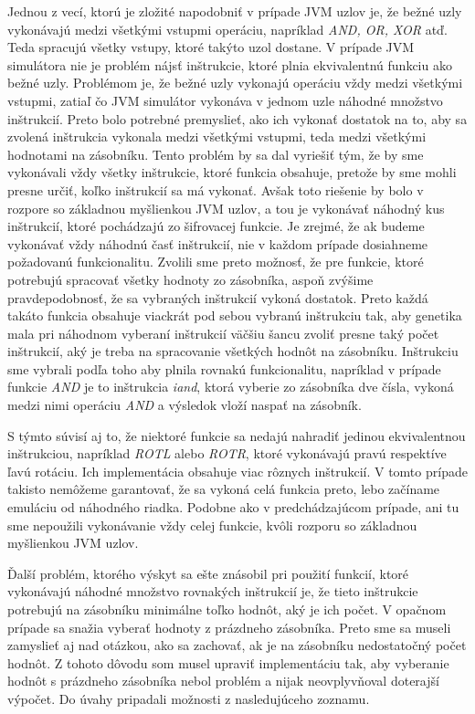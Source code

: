 Jednou z vecí, ktorú je zložité napodobniť v prípade JVM uzlov je, že bežné uzly vykonávajú medzi všetkými vstupmi operáciu, napríklad \textit{AND, OR, XOR} atď. Teda spracujú všetky vstupy, ktoré takýto uzol dostane. V prípade JVM simulátora nie je problém nájsť inštrukcie, ktoré plnia ekvivalentnú funkciu ako bežné uzly. Problémom je, že bežné uzly vykonajú operáciu vždy medzi všetkými vstupmi, zatiaľ čo JVM simulátor vykonáva v jednom uzle náhodné množstvo inštrukcií. Preto bolo potrebné premyslieť, ako ich vykonať dostatok na to, aby sa zvolená inštrukcia vykonala medzi všetkými vstupmi, teda medzi všetkými hodnotami na zásobníku. Tento problém by sa dal vyriešiť tým, že by sme vykonávali vždy všetky inštrukcie, ktoré funkcia obsahuje, pretože by sme mohli presne určiť, koľko inštrukcií sa má vykonať. Avšak toto riešenie by bolo v rozpore so základnou myšlienkou JVM uzlov, a tou je vykonávať náhodný kus inštrukcií, ktoré pochádzajú zo šifrovacej funkcie. Je zrejmé, že ak budeme vykonávať vždy náhodnú časť inštrukcií, nie v každom prípade dosiahneme požadovanú funkcionalitu. Zvolili sme preto možnosť, že pre funkcie, ktoré potrebujú spracovať všetky hodnoty zo zásobníka, aspoň zvýšime pravdepodobnosť, že sa vybraných inštrukcií vykoná dostatok. Preto každá takáto funkcia obsahuje viackrát pod sebou vybranú inštrukciu tak, aby genetika mala pri náhodnom vyberaní inštrukcií väčšiu šancu zvoliť presne taký počet inštrukcií, aký je treba na spracovanie všetkých hodnôt na zásobníku. Inštrukciu sme vybrali podľa toho aby plnila rovnakú funkcionalitu, napríklad v prípade funkcie \textit{AND} je to inštrukcia \textit{iand}, ktorá vyberie zo zásobníka dve čísla, vykoná medzi nimi operáciu \textit{AND} a výsledok vloží naspať na zásobník. 

S týmto súvisí aj to, že niektoré funkcie sa nedajú nahradiť jedinou ekvivalentnou inštrukciou, napríklad \textit{ROTL} alebo \textit{ROTR}, ktoré vykonávajú pravú respektíve ľavú rotáciu. Ich implementácia obsahuje viac rôznych inštrukcií. V tomto prípade takisto nemôžeme garantovať, že sa vykoná celá funkcia preto, lebo začíname emuláciu od náhodného riadka. Podobne ako v predchádzajúcom prípade, ani tu sme nepoužili vykonávanie vždy celej funkcie, kvôli rozporu so základnou myšlienkou JVM uzlov.

Ďalší problém, ktorého výskyt sa ešte znásobil pri použití funkcií, ktoré vykonávajú náhodné množstvo rovnakých inštrukcií je, že tieto inštrukcie potrebujú na zásobníku minimálne toľko hodnôt, aký je ich počet. V opačnom prípade sa snažia vyberať hodnoty z prázdneho zásobníka. Preto sme sa museli zamyslieť aj nad otázkou, ako sa zachovať, ak je na zásobníku nedostatočný počet hodnôt. Z tohoto dôvodu som musel upraviť implementáciu tak, aby vyberanie hodnôt s prázdneho zásobníka nebol problém a nijak neovplyvňoval doterajší výpočet. Do úvahy pripadali možnosti z nasledujúceho zoznamu.

